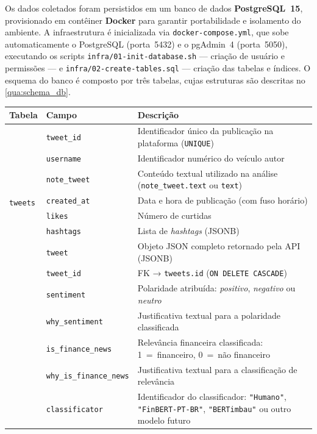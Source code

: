 Os dados coletados foram persistidos em um banco de dados \textbf{PostgreSQL~15}, provisionado em contêiner \textbf{Docker} para garantir portabilidade e isolamento do ambiente. A infraestrutura é inicializada via \texttt{docker-compose.yml}, que sobe automaticamente o PostgreSQL (porta~5432) e o pgAdmin~4 (porta~5050), executando os scripts \texttt{infra/01-init-database.sh} — criação de usuário e permissões — e \texttt{infra/02-create-tables.sql} — criação das tabelas e índices. O esquema do banco é composto por três tabelas, cujas estruturas são descritas no \autoref{qua:schema_db}.

\begin{quadro}[!htb]
	\caption{\label{qua:schema_db}Estrutura das tabelas do banco de dados PostgreSQL}
	
	\begin{tabular}{|p{4.5cm}|p{4.5cm}|p{5.8cm}|}
		\hline
		\textbf{Tabela} & \textbf{Campo} & \textbf{Descrição} \\
		\hline
		\multirow{8}{*}{\texttt{tweets}} & \texttt{tweet\_id} & Identificador único da publicação na plataforma (\texttt{UNIQUE}) \\ & \texttt{username} & Identificador numérico do veículo autor \\
		& \texttt{note\_tweet} & Conteúdo textual utilizado na análise (\texttt{note\_tweet.text} ou \texttt{text}) \\ & \texttt{created\_at} & Data e hora de publicação (com fuso horário) \\ & \texttt{likes}
		& Número de curtidas \\ & \texttt{hashtags} & Lista de \textit{hashtags} (JSONB) \\ & \texttt{tweet} & Objeto JSON completo retornado pela API
		(JSONB) \\
		
		\hline
		\multirow{7}{*}{\texttt{tweets\_classification}} & \texttt{tweet\_id} & FK → \texttt{tweets.id} (\texttt{ON DELETE CASCADE}) \\ & \texttt{sentiment} & Polaridade atribuída: \textit{positivo}, \textit{negativo} ou \textit{neutro} \\ & \texttt{why\_sentiment} & Justificativa textual para a polaridade classificada \\ & \texttt{is\_finance\_news}   & Relevância financeira classificada: 1~=~financeiro, 0~=~não financeiro \\ & \texttt{why\_is\_finance\_news} & Justificativa textual para a classificação de relevância \\ & \texttt{classificator} & Identificador do classificador: \texttt{"Humano"}, \texttt{"FinBERT-PT-BR"}, \texttt{"BERTimbau"} ou outro modelo futuro \\
		

\end{tabular}
\end{quadro}
